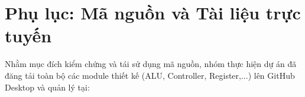 \documentclass[12pt,a4paper]{article}
\begin{document}
    
    
    
    \newpage
    
    \tableofcontents
    \newpage

   
    \setcounter{page}{1}

    
    
    \newpage

    
    
    \newpage

   
    
    \newpage

    
    \newpage

    
    \newpage

    
    \newpage

    
    \newpage

\section*{Phụ lục: Mã nguồn và Tài liệu trực tuyến}

Nhằm mục đích kiểm chứng và tái sử dụng mã nguồn, nhóm thực hiện dự án đã đăng tải toàn bộ các module thiết kế (ALU, Controller, Register,...) lên GitHub Desktop và quản lý tại:

\vspace{0.5cm}
\centering
{}
\end{document}
